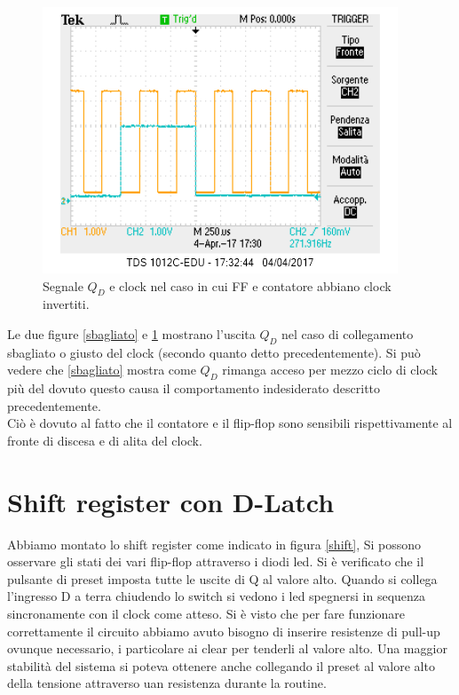 \documentclass[10pt,a4paper]{article}
\begin{document}
\begin{figure}
\centering
\includegraphics[scale=1.0]{clockgiusto.png}
\caption{Segnale $Q_D$ e clock nel caso in cui FF e contatore abbiano clock invertiti.\label{giusto}}
\end{figure}

Le due figure \ref{sbagliato} e \ref{giusto} mostrano l'uscita $Q_D$ nel caso di collegamento sbagliato o giusto del clock (secondo quanto detto precedentemente). Si può vedere che \ref{sbagliato} mostra come $Q_D$ rimanga acceso per mezzo ciclo di clock più del dovuto questo causa il comportamento indesiderato descritto precedentemente.\\
Ciò è dovuto al fatto che il contatore e il flip-flop sono sensibili rispettivamente al fronte di discesa e di alita del clock.\\

\section{Shift register con D-Latch}
Abbiamo montato lo shift register come indicato in figura \ref{shift}, Si possono osservare gli stati dei vari flip-flop attraverso i diodi led. Si è verificato che il pulsante di preset imposta tutte le uscite di Q al valore alto. Quando si collega l'ingresso D a terra chiudendo lo switch si vedono i led spegnersi in sequenza sincronamente con il clock come atteso. Si è visto che per fare funzionare correttamente il circuito abbiamo avuto bisogno di inserire resistenze di pull-up ovunque necessario, i  particolare ai clear per tenderli al valore alto. Una maggior stabilità del sistema si poteva ottenere anche collegando il preset al valore alto della tensione attraverso uan resistenza durante la routine.\\
\end{document}
